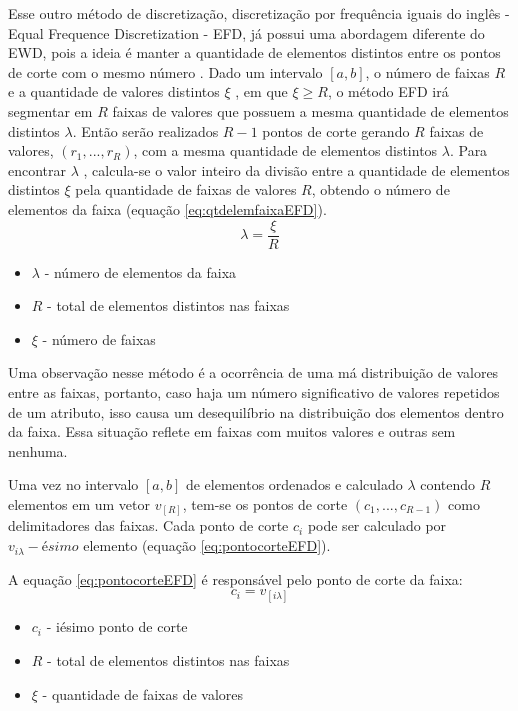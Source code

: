 Esse outro método de discretização, discretização por frequência iguais do inglês - Equal Frequence Discretization - EFD, já possui uma abordagem diferente do EWD, pois a ideia é manter a quantidade de elementos distintos entre os pontos de corte com o mesmo número \cite{Baron2016,Yang2002}. Dado um intervalo ${[a,b]}$, o número de faixas ${R}$ e a quantidade de valores distintos ${\xi}$ , em que ${\xi \geqslant R}$, o método EFD irá segmentar em ${R}$ faixas de valores que possuem a mesma quantidade de elementos distintos ${\lambda}$. Então serão realizados ${R-1}$ pontos de corte gerando ${R}$ faixas de valores, ${(r_1,...,r_R)}$, com a mesma quantidade de elementos distintos ${\lambda}$. Para encontrar ${\lambda}$ , calcula-se o valor inteiro da divisão entre a quantidade de elementos distintos ${\xi}$ pela quantidade de faixas de valores ${R}$, obtendo o número de elementos da faixa (equação \ref{eq:qtdelemfaixaEFD}). 
\begin{equation}
\lambda = \frac{\xi}{R}
 \label{eq:qtdelemfaixaEFD}
\end{equation}
\begin{itemize}[noitemsep]
 \item ${\lambda}$ - número de elementos da faixa
 \item ${R}$ - total de elementos distintos nas faixas
 \item ${\xi}$ - número de faixas
\end{itemize}


Uma observação nesse método é a ocorrência de uma má distribuição de valores entre as faixas, portanto, caso haja um número significativo de valores repetidos de um atributo, isso causa um desequilíbrio na distribuição dos elementos dentro da faixa. Essa situação reflete em faixas com muitos valores e outras sem nenhuma. 

Uma vez no intervalo ${[a,b]}$ de elementos ordenados e calculado ${\lambda}$ contendo ${R}$ elementos em um vetor ${v_{[R]}}$, tem-se os pontos de corte ${(c_1,...,c_{R-1})}$ como  delimitadores das faixas. Cada ponto de corte ${c_i}$ pode ser calculado por ${v_{i\lambda}-ésimo}$ elemento (equação \ref{eq:pontocorteEFD}).

A equação \ref{eq:pontocorteEFD} é responsável pelo ponto de corte da faixa:
\begin{equation}
c_i = v_{[i\lambda]}
 \label{eq:pontocorteEFD}
\end{equation}
\begin{itemize}[noitemsep]
 \item ${c_i}$ - iésimo ponto de corte
 \item ${R}$ - total de elementos distintos nas faixas
 \item ${\xi}$ - quantidade de faixas de valores
\end{itemize}

